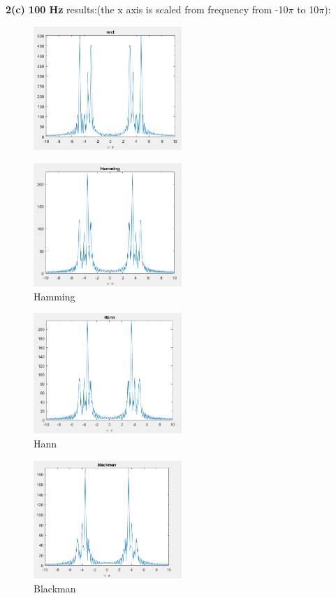 \documentclass[twoside]{article}
\begin{document}
\noindent \textbf {2(c)  100 Hz}
results:(the x axis is scaled from frequency from -10$\pi$ to 10$\pi$):
\begin{figure}[H]
   \centering
   \includegraphics[width = 0.5\textwidth]{./data/rect_100.png}  
   \caption{}
\end{figure}
\begin{figure}[H]
   \centering
   \includegraphics[width = 0.5\textwidth]{./data/hamming_100.png}  
   \caption{Hamming}
\end{figure}
\begin{figure}[H]
   \centering
   \includegraphics[width = 0.5\textwidth]{./data/hann_100.png}  
   \caption{Hann}
\end{figure}
\begin{figure}[H]
   \centering
   \includegraphics[width = 0.5\textwidth]{./data/blackman_100.png}  
   \caption{Blackman}
\end{figure}
\end{document}
